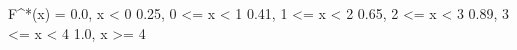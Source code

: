 F^*(x) = 
    0.0, x < 0
    0.25,  0 <= x < 1 
    0.41,  1 <= x < 2 
    0.65,  2 <= x < 3 
    0.89,  3 <= x < 4 
    1.0, x >= 4 
